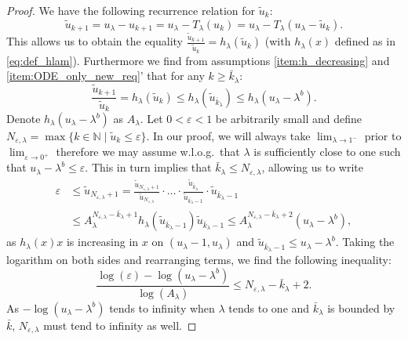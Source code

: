 \documentclass[12pt]{report}
\begin{document}
\begin{proof}
	We have the following recurrence relation for $\tilde u_k$:
	$$
	\tilde u_{k+1} = u_\lambda - u_{k+1} = u_\lambda - T_\lambda(u_k) = u_\lambda - T_\lambda(u_\lambda - \tilde u_k).
	$$
	This allows us to obtain the equality $\frac{\tilde u_{k+1}}{\tilde u_k} = h_{\lambda}(\tilde u_k)$ (with $h_\lambda(x)$ defined as in \eqref{eq:def_hlam}). Furthermore we find from assumptions \ref{item:h_decreasing} and \ref{item:ODE_only_new_req}' that for any $k \geq \bar k_\lambda$:
	$$
	\frac{\tilde{u}_{k+1}}{\tilde{u}_k} = h_{\lambda}(\tilde u_k) \leq h_\lambda(\tilde{u}_{\bar k_\lambda}) \leq h_{\lambda}(u_{\lambda} - \lambda^b).
	$$
	Denote $h_{\lambda}(u_{\lambda} - \lambda^b)$ as $A_{\lambda}$.
	Let $0 < \varepsilon < 1$ be arbitrarily small and define $N_{\varepsilon, \lambda} = \max\{k \in \mathbb{N} \mid \tilde u_k \leq \varepsilon\}$. In our proof, we will always take $\lim_{\lambda \rightarrow 1^-}$ prior to $\lim_{\varepsilon \rightarrow 0^+}$ therefore we may assume w.l.o.g.~that $\lambda$ is sufficiently close to one such that $u_\lambda - \lambda^b \leq \varepsilon$.
	This in turn implies that $\bar k_\lambda \leq N_{\varepsilon, \lambda}$, allowing us to write
	\begin{align*}
		\varepsilon & \leq \tilde u_{N_{\varepsilon, \lambda} +1} = \frac{\tilde u_{N_{\varepsilon,\lambda}+1}}{\tilde u_{N_{\varepsilon,\lambda}}} \cdot \ldots \cdot \frac{\tilde u_{\bar k_\lambda}}{\tilde u_{\bar k_\lambda-1}} \cdot \tilde u_{\bar k_\lambda-1} \\
		&\leq A_{\lambda}^{N_{\varepsilon, \lambda}-\bar k_\lambda+1} 
		h_\lambda(\tilde u_{\bar k_\lambda-1}) \tilde u_{\bar k_\lambda-1}
		\leq A_{\lambda}^{N_{\varepsilon, \lambda}-\bar k_\lambda+2} (u_\lambda - \lambda^b),
	\end{align*}
	as $h_\lambda(x)x$ is increasing in $x$ on $(u_\lambda-1,u_\lambda)$ and
	$\tilde u_{\bar k_\lambda - 1} \leq u_\lambda - \lambda^b$. 
	Taking the logarithm on both sides and rearranging terms, we find the following inequality:
	$$
	\frac{\log(\varepsilon)-\log(u_\lambda-\lambda^b)}{\log(A_\lambda)} \leq N_{\varepsilon, \lambda} - \bar k_\lambda + 2.
	$$
	As $-\log(u_\lambda-\lambda^b)$ tends to infinity when $\lambda$ tends to one and 
	$\bar k_\lambda$ is bounded by $\bar k$, $N_{\varepsilon, \lambda}$ must tend to infinity as well.
	

\end{proof}
\end{document}
